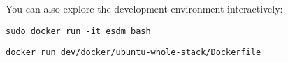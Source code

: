 You can also explore the development environment interactively:

\begin{lstlisting}
sudo docker run -it esdm bash
\end{lstlisting}

\begin{lstlisting}
docker run dev/docker/ubuntu-whole-stack/Dockerfile
\end{lstlisting}












